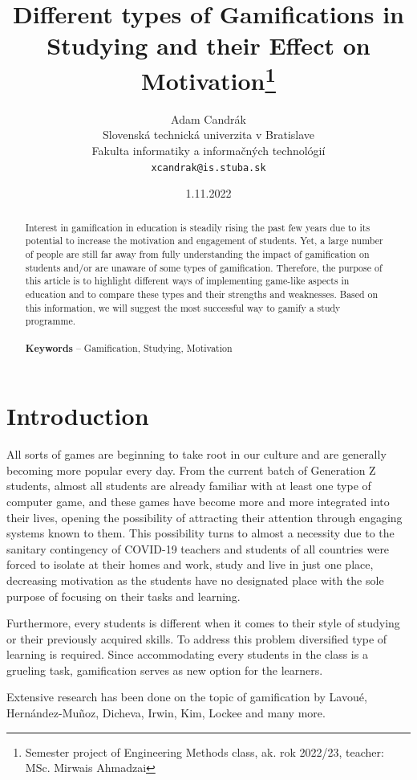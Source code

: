 \documentclass[10pt,oneside,english,a4paper]{article}
\title{Different types of Gamifications in Studying and their Effect on Motivation\thanks{Semester project of Engineering Methods class, ak. rok 2022/23, teacher: MSc. Mirwais Ahmadzai}}
\author{Adam Candrák\\[2pt]
	{\small Slovenská technická univerzita v Bratislave}\\
	{\small Fakulta informatiky a informačných technológií}\\
	{\small \texttt{xcandrak@is.stuba.sk}}
	}
\date{\small 1.11.2022}
\begin{document}
\maketitle

\begin{abstract}
Interest in gamification in education is steadily rising the past few years due to its potential to increase the motivation and engagement of students. Yet, a large number of people are still far away from fully understanding the impact of gamification on students and/or are unaware of some types of gamification. Therefore, the purpose of this article is to highlight different ways of implementing game-like aspects in education and to compare these types and their strengths and weaknesses. Based on this information, we will suggest the most successful way to gamify a study programme.
\\\\
\textbf {Keywords} – Gamification, Studying, Motivation

\end{abstract}



\section{Introduction}


\par
All sorts of games are beginning to take root in our culture and are generally becoming more popular every day. From the current batch of Generation Z students, almost all students are already familiar with at least one type of computer game, and these games have become more and more integrated into their lives, opening the possibility of attracting their attention through engaging systems known to them. This possibility turns to almost a necessity due to the sanitary contingency of COVID-19 teachers and students of all countries were forced to isolate at their homes and work, study and live in just one place, decreasing motivation as the students have no designated place with the sole purpose of focusing on their tasks and learning.\cite{virtual}
\par
Furthermore, every students is different when it comes to their style of studying or their previously acquired skills. To address this problem diversified type of learning is required. Since accommodating every students in the class is a grueling task, gamification serves as new option for the learners.\cite{adaptive}
\par
Extensive research has been done on the topic of gamification by Lavoué, Hernández-Muñoz, Dicheva, Irwin, Kim, Lockee and many more.
\end{document}
